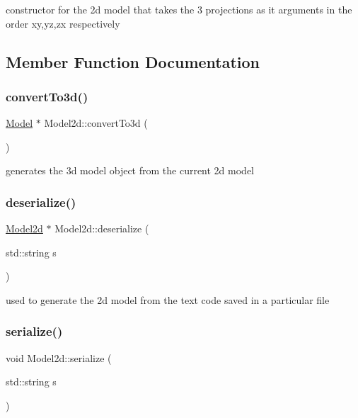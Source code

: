 constructor for the 2d model that takes the 3 projections as it arguments in the order xy,yz,zx respectively 



\subsection{Member Function Documentation}
\mbox{\label{class_model2d_ab39a4f4a2c6430cee2b226a9509ec38b}} 
\subsubsection{\texorpdfstring{convert\+To3d()}{convertTo3d()}}
{\footnotesize\ttfamily \mbox{\hyperlink{class_model}{Model}} $\ast$ Model2d\+::convert\+To3d (\begin{DoxyParamCaption}{ }\end{DoxyParamCaption})}



generates the 3d model object from the current 2d model 

\mbox{\label{class_model2d_aa3c8399ef5cf86bb176b111c132f30b7}} 
\subsubsection{\texorpdfstring{deserialize()}{deserialize()}}
{\footnotesize\ttfamily \mbox{\hyperlink{class_model2d}{Model2d}} $\ast$ Model2d\+::deserialize (\begin{DoxyParamCaption}\item[{std\+::string}]{s }\end{DoxyParamCaption})\hspace{0.3cm}{\ttfamily [static]}}



used to generate the 2d model from the text code saved in a particular file 

\mbox{\label{class_model2d_a9dbe9eafd94b347c3257ac90e743065c}} 
\subsubsection{\texorpdfstring{serialize()}{serialize()}}
{\footnotesize\ttfamily void Model2d\+::serialize (\begin{DoxyParamCaption}\item[{std\+::string}]{s }\end{DoxyParamCaption})}



